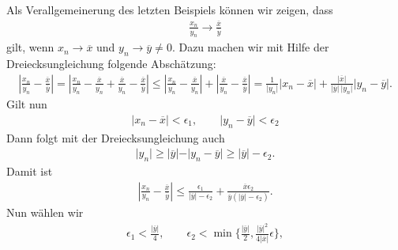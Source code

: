 \documentclass[letterpaper,10pt,english]{jupyterBook}
\begin{document}
Als Verallgemeinerung des letzten Beispiels können wir zeigen, dass
\begin{equation*}
\begin{split} \frac{x_n}{y_n} \rightarrow \frac{\overline{x}}{\overline{y}} \end{split}
\end{equation*}
gilt, wenn \(x_n \rightarrow \overline{x}\) und \(y_n \rightarrow \overline{y} \neq 0\). Dazu machen wir mit Hilfe der Dreiecksungleichung folgende Abschätzung:
\begin{equation*}
\begin{split}\left\vert \frac{x_n}{y_n} -\frac{\overline{x}}{\overline{y}} \right\vert =
\left\vert \frac{x_n}{y_n} -\frac{\overline{x}}{y_n}+\frac{\overline{x}}{y_n}-\frac{\overline{x}}{\overline{y}} \right\vert \leq 
\left\vert \frac{x_n}{y_n} -\frac{\overline{x}}{y_n}\right\vert+\left\vert\frac{\overline{x}}{y_n}-\frac{\overline{x}}{\overline{y}} \right\vert = \frac{1}{\vert y_n \vert} \vert x_n - \overline{x}\vert+
\frac{\vert \overline{x} \vert}{\vert \overline{y} \vert~\vert y_n \vert} \vert y_n - \overline{y}\vert.\end{split}
\end{equation*}
Gilt nun
\begin{equation*}
\begin{split}  \vert x_n - \overline{x}\vert < \epsilon_1, \qquad  \vert y_n - \overline{y}\vert < \epsilon_2 \end{split}
\end{equation*}
Dann folgt mit der Dreiecksungleichung auch
\begin{equation*}
\begin{split} \vert y_n \vert \geq \vert \overline{y}\vert - \vert y_n - \overline{y}\vert \geq \vert \overline{y}\vert - \epsilon_2 . \end{split}
\end{equation*}
Damit ist
\begin{equation*}
\begin{split} \left\vert \frac{x_n}{y_n} -\frac{\overline{x}}{\overline{y}} \right\vert \leq \frac{\epsilon_1}{\vert \overline{y} \vert - \epsilon_2} + \frac{\overline{x}\epsilon_2}{\overline{y}(\vert \overline{y} \vert - \epsilon_2)}  . \end{split}
\end{equation*}
Nun wählen wir
\begin{equation*}
\begin{split} \epsilon_1 <\frac{\vert \overline{y} \vert }4,  \qquad \epsilon_2 < \min\{\frac{\vert \overline{y} \vert }2, \frac{\vert \overline{y} \vert^2}{4 \vert \overline{x} \vert} \epsilon \} , \end{split}
\end{equation*}
\end{document}
